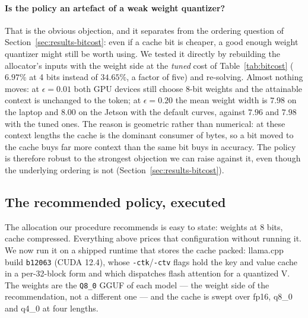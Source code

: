 \documentclass[10pt,journal]{IEEEtran}
\begin{document}
\paragraph*{Is the policy an artefact of a weak weight quantizer?}
That is the obvious objection, and it separates from the ordering question of
Section~\ref{sec:results-bitcost}: even if a cache bit is cheaper, a good enough
weight quantizer might still be worth using. We tested it directly by rebuilding
the allocator's inputs with the weight side at the \emph{tuned} cost of
Table~\ref{tab:bitcost} ($6.97\%$ at 4 bits instead of $34.65\%$, a factor of
five) and re-solving. Almost nothing moves: at $\epsilon{=}0.01$ both GPU devices
still choose 8-bit weights and the attainable context is unchanged to the token;
at $\epsilon{=}0.20$ the mean weight width is $7.98$ on the laptop and $8.00$ on the Jetson
with the default curves, against $7.96$ and $7.98$ with the tuned ones. The reason is geometric rather
than numerical: at these context lengths the cache is the dominant consumer of
bytes, so a bit moved to the cache buys far more context than the same bit buys
in accuracy. The policy is therefore robust to the strongest objection we can
raise against it, even though the underlying ordering is not
(Section~\ref{sec:results-bitcost}).

\subsection{The recommended policy, executed}
\label{sec:results-exec}

The allocation our procedure recommends is easy to state: weights at 8 bits, cache
compressed. Everything above prices that configuration without running it. We now
run it on a shipped runtime that stores the cache packed: llama.cpp build
\texttt{b12063} (CUDA 12.4), whose \texttt{-ctk}/\texttt{-ctv} flags hold the key
and value cache in a per-32-block form and which dispatches flash attention for a
quantized V. The weights are the \texttt{Q8\_0} GGUF of each model --- the weight side of the
recommendation, not a different one --- and the cache is swept over fp16, q8\_0 and
q4\_0 at four lengths.
\end{document}
